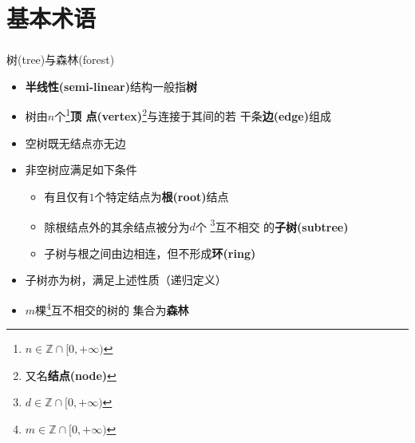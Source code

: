 \section{基本术语}

\begin{frame}
    \frametitle{\insertsectionhead}
    \begin{block}{树(tree)与森林(forest)}
        \begin{itemize}
            \item \textbf{半线性(semi-linear)}结构一般指\textbf{树}
            \item 树由$n$个\footnote{$n\in\mathbb{Z}\cap[0,+\infty)$}\textbf{顶
                  点(vertex)}\footnote{又名\textbf{结点(node)}}与连接于其间的若
                  干条\textbf{边(edge)}组成
            \item \alert{空树}既无结点亦无边
            \item \alert{非空树}应满足如下条件
                \begin{itemize}
                    \item 有且仅有$1$个特定结点为\textbf{根(root)}结点
                    \item 除根结点外的其余结点被分为$d$个
                        \footnote{$d\in\mathbb{Z}\cap[0,+\infty)$}\alert{互不相交}
                        的\textbf{子树(subtree)}
                    \item 子树与根之间由边相连，但不形成\textbf{环(ring)}
                \end{itemize} 
            \item 子树亦为树，满足上述性质（递归定义）
            \item $m$棵\footnote{$m\in\mathbb{Z}\cap[0,+\infty)$}互不相交的树的
                  集合为\textbf{森林}
        \end{itemize}
    \end{block}
\end{frame}

